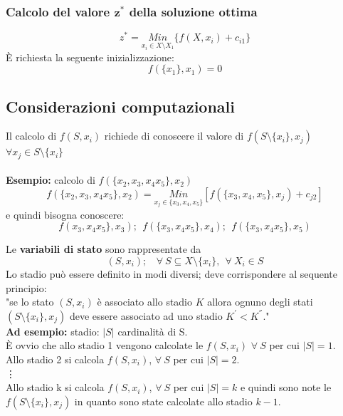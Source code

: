 \subsubsection{Calcolo del valore $\boldsymbol{z^{*}}$ della soluzione ottima}
\begin{equation*}
	z^{*}=\underset{x_{i}\in X\setminus{X_{1}}}{Min}\{f(X,x_{i})+c_{i1}\}
\end{equation*}
È richiesta la seguente inizializzazione:
\begin{equation*}
	f(\{x_{1}\},x_{1})=0
\end{equation*}
\clearpage
\subsection{Considerazioni computazionali}
Il calcolo di $f(S,x_{i})$ richiede di conoscere il valore di $f(S\setminus\{x_{i}\}, x_{j})$ $\forall x_{j}\in S\setminus\{x_{i}\}$\\\\
\textbf{Esempio:} calcolo di $f(\{x_{2},x_{3},x_{4}x_{5}\},x_{2})$
\begin{equation*}
	f(\{x_{2},x_{3},x_{4}x_{5}\},x_{2})=\underset{x_{j}\in\{x_{3},x_{4},x_{5}\}}{Min}[f(\{x_{3},x_{4},x_{5}\},x_{j})+c_{j2}]
\end{equation*}
e quindi bisogna conoscere:
\begin{equation*}
	f(x_{3},x_{4}x_{5}\},x_{3});\ \ f(\{x_{3},x_{4}x_{5}\},x_{4});\ \ f(\{x_{3},x_{4}x_{5}\},x_{5})
\end{equation*}

Le \textbf{variabili di stato} sono rappresentate da
\begin{equation*}
	(S,x_{i});\ \ \ \ \forall\ S\subseteq X\setminus\{x_{i}\},\ \ \forall\ X_{i}\in S
\end{equation*}
Lo stadio può essere definito in modi diversi; deve corrispondere al sequente principio:\\

"se lo stato $(S,x_{i})$ è associato allo stadio $K$ allora ognuno degli stati $(S\setminus\{x_{i}\},x_{j})$ deve essere associato ad uno stadio $K^{'}<K^{''}$."\\

\textbf{Ad esempio:} stadio: $|S|$ cardinalità di S.\\
È ovvio che allo stadio 1 vengono calcolate le $f(S,x_{i})$ $\forall\ S$ per cui $|S|=1$.\\
Allo stadio 2 si calcola $f(S,x_{i})$, $\forall\ S$ per cui $|S|=2$.\\
\vdots\\
Allo stadio k si calcola $f(S,x_{i})$, $\forall\ S$ per cui $|S|=k$ e quindi sono note le $f(S\setminus\{x_{i}\},x_{j})$ in quanto sono state calcolate allo stadio $k-1$.\\

